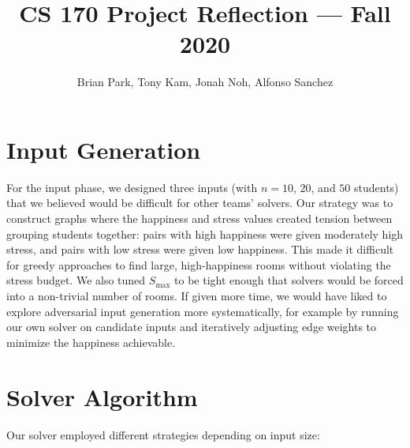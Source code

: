 \documentclass[11pt]{article}
\title{CS 170 Project Reflection --- Fall 2020}
\author{Brian Park, Tony Kam, Jonah Noh, Alfonso Sanchez}
\date{}
\begin{document}
\maketitle

\section*{Input Generation}

For the input phase, we designed three inputs (with $n = 10$, $20$, and $50$ students) that we believed would be difficult for other teams' solvers. Our strategy was to construct graphs where the happiness and stress values created tension between grouping students together: pairs with high happiness were given moderately high stress, and pairs with low stress were given low happiness. This made it difficult for greedy approaches to find large, high-happiness rooms without violating the stress budget. We also tuned $S_{\max}$ to be tight enough that solvers would be forced into a non-trivial number of rooms. If given more time, we would have liked to explore adversarial input generation more systematically, for example by running our own solver on candidate inputs and iteratively adjusting edge weights to minimize the happiness achievable.

\section*{Solver Algorithm}

Our solver employed different strategies depending on input size:
\end{document}
